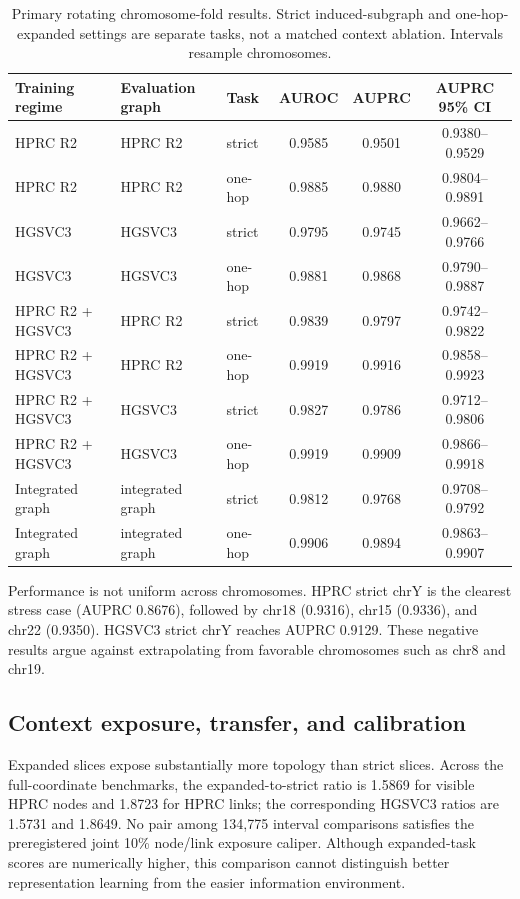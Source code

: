 \IfFileExists{ws-procs11x85.cls}{\worldscientificclasstrue\documentclass{ws-procs11x85}}{\worldscientificclassfalse\documentclass[11pt]{article}\usepackage[margin=1in]{geometry}}
\providecommand{\tbl}[2]{\caption{#1}#2}
\providecommand{\toprule}{\hline}
\providecommand{\colrule}{\hline}
\providecommand{\botrule}{\hline}
\begin{document}
\begin{table}[t]
\tbl{Primary rotating chromosome-fold results. Strict induced-subgraph and
one-hop-expanded settings are separate tasks, not a matched context ablation.
Intervals resample chromosomes.}
{\small
\begin{tabular}{@{}lllccc@{}}
\toprule
Training regime & Evaluation graph & Task & AUROC & AUPRC & AUPRC 95\% CI\\
\colrule
HPRC R2 & HPRC R2 & strict & 0.9585 & 0.9501 & 0.9380--0.9529\\
HPRC R2 & HPRC R2 & one-hop & 0.9885 & 0.9880 & 0.9804--0.9891\\
HGSVC3 & HGSVC3 & strict & 0.9795 & 0.9745 & 0.9662--0.9766\\
HGSVC3 & HGSVC3 & one-hop & 0.9881 & 0.9868 & 0.9790--0.9887\\
HPRC R2 + HGSVC3 & HPRC R2 & strict & 0.9839 & 0.9797 & 0.9742--0.9822\\
HPRC R2 + HGSVC3 & HPRC R2 & one-hop & 0.9919 & 0.9916 & 0.9858--0.9923\\
HPRC R2 + HGSVC3 & HGSVC3 & strict & 0.9827 & 0.9786 & 0.9712--0.9806\\
HPRC R2 + HGSVC3 & HGSVC3 & one-hop & 0.9919 & 0.9909 & 0.9866--0.9918\\
Integrated graph & integrated graph & strict & 0.9812 & 0.9768 & 0.9708--0.9792\\
Integrated graph & integrated graph & one-hop & 0.9906 & 0.9894 & 0.9863--0.9907\\
\botrule
\end{tabular}}
\label{tab:current_primary}
\end{table}

Performance is not uniform across chromosomes. HPRC strict chrY is the clearest
stress case (AUPRC 0.8676), followed by chr18 (0.9316), chr15 (0.9336), and
chr22 (0.9350). HGSVC3 strict chrY reaches AUPRC 0.9129. These negative results
argue against extrapolating from favorable chromosomes such as chr8 and chr19.

\subsection{Context exposure, transfer, and calibration}

Expanded slices expose substantially more topology than strict slices. Across
the full-coordinate benchmarks, the expanded-to-strict ratio is 1.5869 for
visible HPRC nodes and 1.8723 for HPRC links; the corresponding HGSVC3 ratios
are 1.5731 and 1.8649. No pair among 134{,}775 interval comparisons satisfies
the preregistered joint 10\% node/link exposure caliper. Although expanded-task
scores are numerically higher, this comparison cannot distinguish better
representation learning from the easier information environment.
\end{document}
